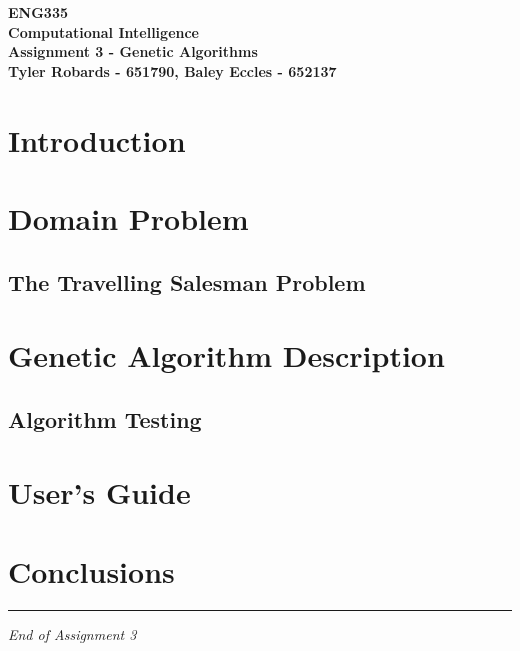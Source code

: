 \documentclass[12pt,a4paper]{article}
\begin{document}
\begin{center}
\textbf{\LARGE ENG335\\[6pt]
Computational Intelligence}\\[10pt]
\textbf{\large Assignment 3 - Genetic Algorithms\\[4pt]
Tyler Robards - 651790, Baley Eccles - 652137}\\
\end{center}

\tableofcontents
\newpage

\section{Introduction}

\section{Domain Problem}

\subsection{The Travelling Salesman Problem}

\section{Genetic Algorithm Description}

\subsection{Algorithm Testing}

\section{User's Guide}

\section{Conclusions}

\vfill
\hrule
\begin{center}
\textit{End of Assignment 3}
\end{center}
\end{document}
